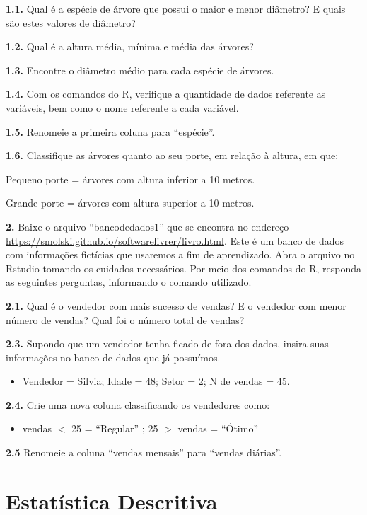 \documentclass[12pt,brazil,oneside]{book}
\providecommand{\tightlist}{%
  \setlength{\itemsep}{0pt}\setlength{\parskip}{0pt}}
\begin{document}
\textbf{1.1.} Qual é a espécie de árvore que possui o maior e menor diâmetro? E quais são estes valores de diâmetro?

\textbf{1.2.} Qual é a altura média, mínima e média das árvores?

\textbf{1.3.} Encontre o diâmetro médio para cada espécie de árvores.

\textbf{1.4.} Com os comandos do R, verifique a quantidade de dados referente as variáveis, bem como o nome referente a cada variável.

\textbf{1.5.} Renomeie a primeira coluna para ``espécie''.

\textbf{1.6.} Classifique as árvores quanto ao seu porte, em relação à altura, em que:

Pequeno porte = árvores com altura inferior a 10 metros.

Grande porte = árvores com altura superior a 10 metros.

\textbf{2.} Baixe o arquivo ``bancodedados1'' que se encontra no endereço \url{https://smolski.github.io/softwarelivrer/livro.html}. Este é um banco de dados com informações fictícias que usaremos a fim de aprendizado. Abra o arquivo no Rstudio tomando os cuidados necessários. Por meio dos comandos do R, responda as seguintes perguntas, informando o comando utilizado.

\textbf{2.1.} Qual é o vendedor com mais sucesso de vendas? E o vendedor com menor número de vendas?
Qual foi o número total de vendas?

\textbf{2.3.} Supondo que um vendedor tenha ficado de fora dos dados, insira suas informações no banco de dados que já possuímos.

\begin{itemize}
\tightlist
\item
  Vendedor = Silvia; Idade = 48; Setor = 2; N de vendas = 45.
\end{itemize}

\textbf{2.4.} Crie uma nova coluna classificando os vendedores como:

\begin{itemize}
\tightlist
\item
  vendas \(<\) 25 = ``Regular'' ; 25 \(>\) vendas = ``Ótimo''
\end{itemize}

\textbf{2.5} Renomeie a coluna ``vendas mensais'' para ``vendas diárias''.

\hypertarget{desc}{%
\chapter{Estatística Descritiva}\label{desc}}
\end{document}
